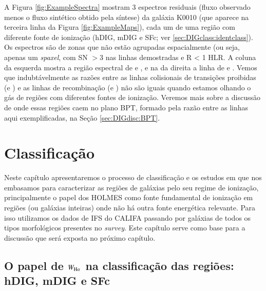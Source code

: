 A Figura \ref{fig:ExampleSpectra} mostram 3 espectros residuais (fluxo observado menos o fluxo sintético obtido pela síntese) da galáxia K0010 (que aparece na terceira linha da Figura \ref{fig:ExampleMaps}), cada um de uma região com diferente fonte de ionização (hDIG, mDIG e SFc; ver \ref{sec:DIGclass:identclass}). Os espectros são de zonas que não estão agrupadas espacialmente  (ou seja, apenas um {\em spaxel}, com SN $> 3$ nas linhas demostradas e R < 1 HLR. A coluna da esquerda mostra a região espectral de \Hb e \Oiii, e na da direita a linha de \Ha e \Nii. Vemos que indubtávelmente as razões entre as linhas colisionais de transições proibidas (\Oiii e \Nii) e as linhas de recombinação (\Hb e \Ha) não são iguais quando estamos olhando o gás de regiões com diferentes fontes de ionização. Veremos mais sobre a discussão de onde essas regiões caem no plano BPT, formado pela razão entre as linhas aqui exemplificadas, na Seção \ref{sec:DIGdisc:BPT}.



\chapter{Classificação}
\label{sec:DIGclass}

Neste capítulo apresentaremos o processo de classificação e os estudos em que nos embasamos para caracterizar as regiões de galáxias pelo seu regime de ionização, principalmente o papel dos HOLMES como fonte fundamental de ionização em regiões (ou galáxias inteiras) onde não há outra fonte energética relevante. Para isso utilizamos os dados de IFS do CALIFA passando por galáxias de todos os tipos morfológicos presentes no {\em survey}. Este capítulo serve como base para a discussão que será exposta no próximo capítulo.


\section{O papel de $W_{{\rm H}\alpha}$ na classificação das regiões: hDIG, mDIG e SFc}
\label{sec:DIGclass:WHa}

